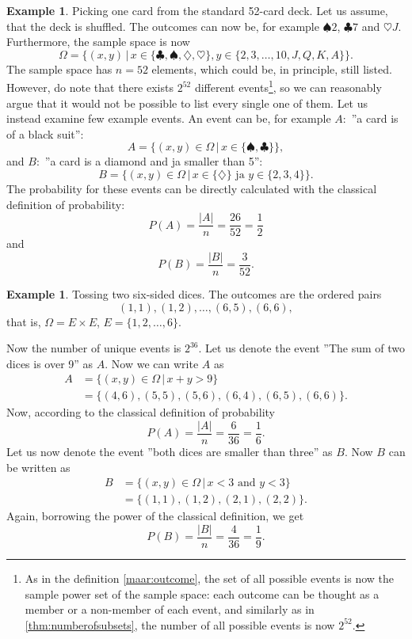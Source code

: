 \documentclass[12pt,a4paper,leqno]{report}
\theoremstyle{plain}
\theoremstyle{definition}
\newtheorem{esim}[equation]{Example}
\begin{document}
\begin{esim}
Picking one card from the standard 52-card deck. Let us assume, that the deck is shuffled. The outcomes can now be, for example $\spadesuit 2$, $\clubsuit 7$ and $\heartsuit J$. Furthermore, the sample space is now
\[
\Omega = \{(x,y) \,|\, x \in \{\clubsuit, \spadesuit, \diamondsuit, \heartsuit\}, y \in \{2,3, \dots, 10, J, Q, K, A\}\}.
\]
The sample space has $n=52$ elements, which could be, in principle, still listed. However, do note that there exists $2^{52}$ different events\footnote{As in the definition \ref{maar:outcome}, the set of all possible events is now the sample power set of the sample space: each outcome can be thought as a member or a non-member of each event, and similarly as in \ref{thm:numberofsubsets}, the number of all possible events is now $2^{52}$.}, so we can reasonably argue that it would not be possible to list every single one of them. Let us instead examine few example events. An event can be, for example $A:$ ''a card is of a black suit'':
\[
A = \{(x,y) \in \Omega \,|\, x \in \{\spadesuit, \clubsuit \}\},
\]
and $B:$ ''a card is a diamond and ja smaller than 5'':
\[
B = \{(x,y) \in \Omega \,|\, x \in \{\diamondsuit\} \,\, \text{ja} \,\, y \in \{2,3,4\} \}.
\]
The probability for these events can be directly calculated with the classical definition of probability:
\[
P(A) = \frac{|A|}{n} = \frac{26}{52} = \frac{1}{2}
\] 
and
\[
P(B) = \frac{|B|}{n} = \frac{3}{52}.
\]
\end{esim}

\begin{esim}\label{esim: two dice} Tossing two six-sided dices. The outcomes are the ordered pairs
\[
(1,1), (1,2), \dots , (6,5), (6,6),
\]
that is, $\Omega = E \times E$, $E = \{1,2, \dots , 6\}$.  

Now the number of unique events is $2^{36}$. Let us denote the event ''The sum of two dices is over 9'' as $A$. Now we can write $A$ as 
\[
\begin{split}
A 	&= \{ (x,y) \in \Omega \,|\, x+y > 9\} \\
	&= \{ (4,6), (5,5), (5,6), (6,4),(6,5), (6,6) \}.
\end{split}
\]
Now, according to the classical definition of probability
\[
P(A) = \frac{|A|}{n} = \frac{6}{36} = \frac{1}{6}.
\]
Let us now denote the event ''both dices are smaller than three'' as $B$. Now $B$ can be written as
\[
\begin{split}
B 	&= \{ (x,y) \in \Omega \,|\, x < 3 \,\,\text{and} \,\, y < 3\} \\
	&= \{ (1,1), (1,2), (2,1), (2,2) \}.
\end{split}
\]
Again, borrowing the power of the classical definition, we get
\[
P(B) = \frac{|B|}{n} = \frac{4}{36} = \frac{1}{9}.
\]
\end{esim}
\end{document}

